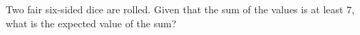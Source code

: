 Two fair six-sided dice are rolled. Given that the sum of the values is at least $7$, what is the expected value of the sum?
